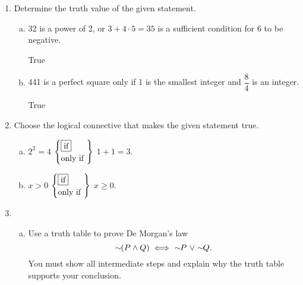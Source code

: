 \documentclass[12pt]{amsart}
\newcommand{\NOT}[1]{\ensuremath{\sim\hspace{-0.05in}#1}}
\begin{document}
\vfill
\begin{enumerate}[{\bfseries 1.}]
\addtocounter{enumi}{1}
\item Determine the truth value of the given statement.
	\begin{enumerate}[(a)]
	\vspace{0.1in}
	\item 32 is a power of 2, or $3+4\cdot 5=35$ is a sufficient condition for 6 to be negative.

		\vfill
		\begin{center}
		True\hspace{2in}
		\end{center}
	\vfill
	\item 441 is a perfect square only if 1 is the smallest integer and $\dfrac{8}{4}$ is an integer.

		\vfill
		\begin{center}
		True\hspace{2in}
		\end{center}
	\vfill
	\end{enumerate}
\item Choose the logical connective that makes the given statement true.
	\begin{enumerate}[(a)]
	\vspace{0.1in}
	\item $2^{2}=4$
		$\left\{\begin{aligned}
		&\text{\framebox{if}} \\
		&\text{only if }
		\end{aligned}\right\}$
		$1+1=3$.
	\vspace{0.1in}
	\item $x>0$
		$\left\{\begin{aligned}
		&\text{\framebox{if}} \\
		&\text{only if }
		\end{aligned}\right\}$
		$x\geq 0$.
	\end{enumerate}
\newpage
\item\begin{enumerate}[(a)]
	\item Use a truth table to prove De Morgan's law 
		$$\NOT{(P \land Q)}\iff\ \NOT{P}\ \lor\NOT{Q}.$$
		You must show all intermediate steps and explain why the truth table supports your conclusion.


\end{enumerate}
\end{enumerate}
\end{document}
